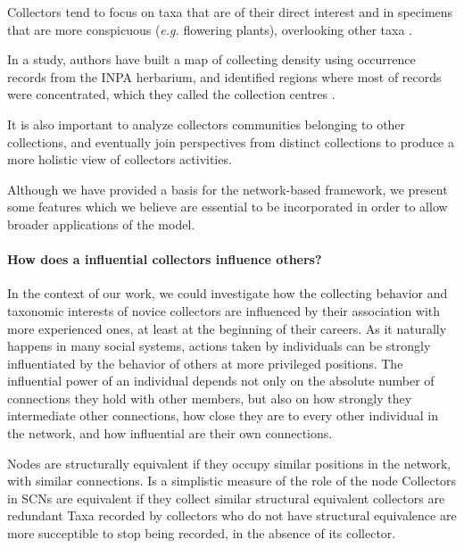 Collectors tend to focus on taxa that are of their direct interest and in specimens that are more conspicuous (\textit{e.g.} flowering plants), overlooking other taxa \cite{VanGemerden2005}.




In a study, authors have built a map of collecting density using occurrence records from the INPA herbarium, and identified regions where most of records were concentrated, which they called the collection centres \cite{Nelson1990}.


It is also important to analyze collectors communities belonging to other collections, and eventually join perspectives from distinct collections to produce a more holistic view of collectors activities.





Although we have provided a basis for the network-based framework, we present some features which we believe are essential to be incorporated in order to allow broader applications of the model.

\paragraph*{How does a influential collectors influence others?}
In the context of our work, we could investigate how the collecting behavior and taxonomic interests of novice collectors are influenced by their association with more experienced ones, at least at the beginning of their careers.
As it naturally happens in many social systems, actions taken by individuals can be strongly influentiated by the behavior of others at more privileged positions.
The influential power of an individual depends not only on the absolute number of connections they hold with other members, but also on how strongly they intermediate other connections, how close they are to every other individual in the network, and how influential are their own connections.

Nodes are structurally equivalent if they occupy similar positions in the network, with similar connections.
Is a simplistic measure of the role of the node
Collectors in SCNs are equivalent if they collect similar 
structural equivalent collectors are redundant
Taxa recorded by collectors who do not have structural equivalence are more succeptible to stop being recorded, in the absence of its collector.


